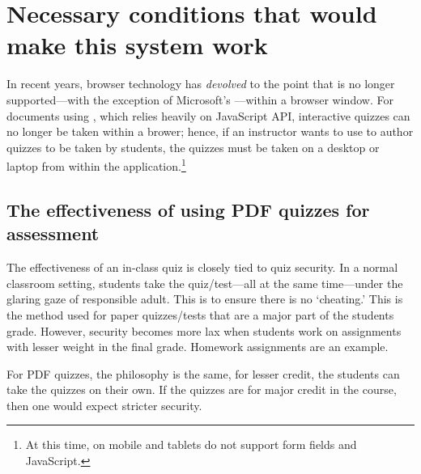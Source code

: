 \documentclass{article}
\makeatletter
\def\hisher{\@ifstar{\hisheri}{\global\advance\hesheCnt1\relax\hisheri}}
\def\hisheri{\ifodd\hesheCnt her\else his\fi}
\makeatother
\begin{document}
\section{Necessary conditions that would make this system work}

In recent years, browser technology has \emph{devolved} to the point that
 is no longer supported---with the exception of Microsoft's
---within a browser window. For documents using
, which relies heavily on  JavaScript API,
interactive quizzes can no longer be taken within a brower; hence, if an
instructor wants to use  to author quizzes to be taken by
{\hisher} students, the quizzes must be taken on a desktop or laptop from
within the  application.\footnote{At this time,  on mobile and tablets do not support form fields and JavaScript.}

\subsection{The effectiveness of using PDF quizzes for assessment}

The effectiveness of an in-class quiz is closely tied to quiz security. In a
normal classroom setting, students take the quiz/test---all at the same
time---under the glaring gaze of responsible adult. This is to ensure there
is no `cheating.' This is the method used for paper quizzes/tests that are a
major part of the students grade. However, security becomes more lax when
students work on assignments with lesser weight in the final grade. Homework
assignments are an example.

For PDF quizzes, the philosophy is the same, for lesser credit, the students
can take the quizzes on their own. If the quizzes are for major credit in the
course, then one would expect stricter security.
\end{document}
